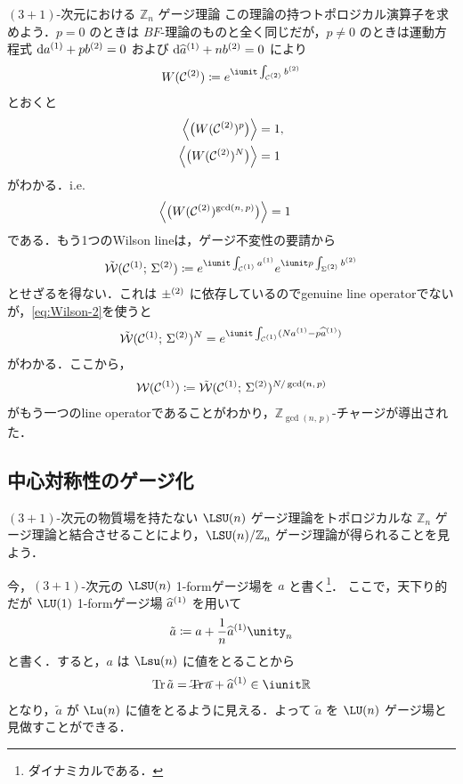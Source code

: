 \documentclass[TQFT_main]{subfiles}
\begin{document}
\begin{myexample}[label=ex:BF-4D]{$(3+1)$-次元における $\mathbb{Z}_n$ ゲージ理論}
    この理論の持つトポロジカル演算子を求めよう．$p = 0$ のときは $BF$-理論のものと全く同じだが，$p \neq 0$ のときは運動方程式 $\dd{a^{(1)}} + p b^{(2)} = 0$ および $\dd{\widehat{a}^{(1)}} + n b^{(2)} = 0$ により
    \begin{align}
        W(\mfdcal{C}{2}) \coloneqq e^{\iunit \int_{\mfdcal{C}{2}} \hg{b}{2}}
    \end{align}
    とおくと
    \begin{align}
        \expval{\bigl( W(\mathcal{C}^{(2)})^p \bigr) } &= 1,\label{eq:Wilson-1}\\
        \expval{\bigl( W(\mathcal{C}^{(2)})^N \bigr) } &= 1 \label{eq:Wilson-2}
    \end{align}
    がわかる．i.e. 
    \begin{align}
        \expval{\bigl( W(\mathcal{C}^{(2)})^{\gcd (n,\, p)} \bigr) } &= 1
    \end{align}
    である．もう1つのWilson lineは，ゲージ不変性の要請から
    \begin{align}
        \tilde{\mathcal{W}}(\mfdcal{C}{1};\, \mfd{\Sigma}{2}) \coloneqq e^{\iunit \int_{\mfdcal{C}{1}} \hg{a}{1}} e^{\iunit p \int_{\mfd{\Sigma}{2}} \hg{b}{2}}
    \end{align}
    とせざるを得ない．これは $\mathcal{\Sigma}^{(2)}$ に依存しているのでgenuine line operatorでないが，\eqref{eq:Wilson-2}を使うと
    \begin{align}
        \tilde{\mathcal{W}}(\mfdcal{C}{1};\, \mfd{\Sigma}{2})^{N} = e^{\iunit \int_{\mfdcal{C}{1}} (N \hg{a}{1} - p \hg{\widehat{a}}{1})}
    \end{align}
    がわかる．ここから，
    \begin{align}
        \mathcal{W}(\mathcal{C}^{(1)}) \coloneqq \tilde{\mathcal{W}}(\mathcal{C}^{(1)};\, \Sigma^{(2)})^{N/\gcd (n,\, p)}
    \end{align}
    がもう一つのline operatorであることがわかり，$\mathbb{Z}_{\gcd (n,\, p)}$-チャージが導出された．
\end{myexample}


\subsection{中心対称性のゲージ化}

$(3+1)$-次元の物質場を持たない $\LSU(n)$ ゲージ理論をトポロジカルな $\mathbb{Z}_n$ ゲージ理論と結合させることにより，$\LSU(n)/\mathbb{Z}_n$ ゲージ理論が得られることを見よう．

今，$(3+1)$-次元の $\LSU(n)$ 1-formゲージ場を $a$ と書く\footnote{ダイナミカルである．}．
ここで，天下り的だが $\LU(1)$ 1-formゲージ場 $\widehat{a}^{(1)}$ を用いて
\begin{align}
    \tilde{a} \coloneqq a + \frac{1}{n} \hg{\widehat{a}}{1} \unity_n
\end{align}
と書く．すると，$a$ は $\Lsu (n)$ に値をとることから
\begin{align}
    \Tr \tilde{a} = \cancel{\Tr a} + \hg{\widehat{a}}{1} \in \iunit \mathbb{R}
\end{align}
となり，$\tilde{a}$ が $\Lu (n)$ に値をとるように見える．よって $\tilde{a}$ を $\LU (n)$ ゲージ場と見做すことができる．
\end{document}
